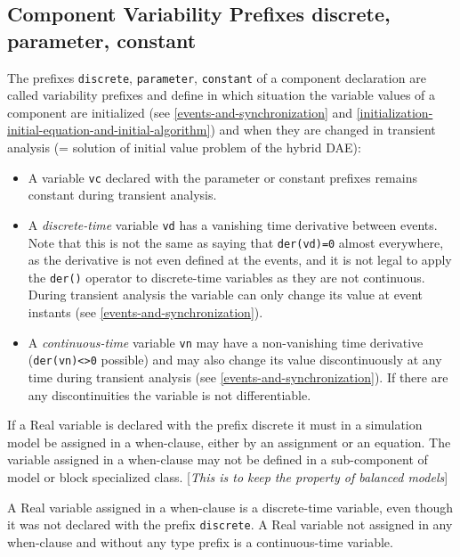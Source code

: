 \subsection{Component Variability Prefixes discrete, parameter, constant}

The prefixes \lstinline!discrete!, \lstinline!parameter!, \lstinline!constant! of a component declaration
are called variability prefixes and define in which situation the
variable values of a component are initialized (see \autoref{events-and-synchronization} and
\autoref{initialization-initial-equation-and-initial-algorithm}) and when they are changed in transient analysis (= solution
of initial value problem of the hybrid DAE):

\begin{itemize}
\item
  A variable \lstinline!vc! declared with the parameter or constant prefixes remains
  constant during transient analysis.
\item
  A \emph{discrete-time} variable \lstinline!vd! has a vanishing time derivative between events.
  Note that this is not the same as saying that \lstinline!der(vd)=0! almost everywhere,
  as the derivative is not even defined at the events, and it is not legal
  to apply the \lstinline!der()! operator
  to discrete-time variables as they are not continuous. During transient analysis the variable
  can only change its value at event
  instants (see \autoref{events-and-synchronization}).
\item
  A \emph{continuous-time} variable \lstinline!vn! may have a non-vanishing time
  derivative (\lstinline!der(vn)<>0! possible) and may also
  change its value discontinuously at any time during transient analysis
  (see \autoref{events-and-synchronization}). If there are any discontinuities the variable is
  not differentiable.
\end{itemize}

If a Real variable is declared with the prefix discrete it must in a
simulation model be assigned in a when-clause, either by an assignment
or an equation. The variable assigned in a when-clause may not be
defined in a sub-component of model or block specialized class.
{[}\emph{This is to keep the property of balanced models}{]}

A Real variable assigned in a when-clause is a discrete-time variable,
even though it was not declared with the prefix \lstinline!discrete!. A Real
variable not assigned in any when-clause and without any type prefix is
a continuous-time variable.

